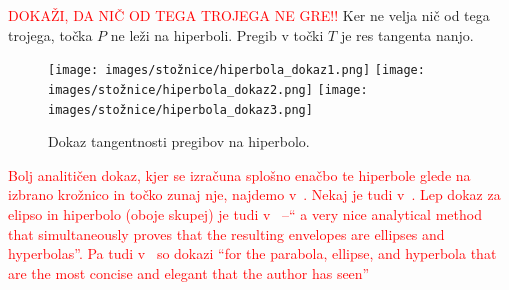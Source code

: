 \begin{dokaz}
    \textcolor{red}{DOKAŽI, DA NIČ OD TEGA TROJEGA NE GRE!!}
    Ker ne velja nič od tega trojega, točka $P$ ne leži na hiperboli. Pregib v točki $T$ je res tangenta nanjo.

    \begin{figure}[h]
        \centering
        \texttt{[image: images/stožnice/hiperbola\_dokaz1.png]}
        \texttt{[image: images/stožnice/hiperbola\_dokaz2.png]}
        \texttt{[image: images/stožnice/hiperbola\_dokaz3.png]}
        \caption[Tangentnost na hiperbolo]{Dokaz tangentnosti pregibov na hiperbolo.}
        \label{fig:dokaz_hiperbola}
    \end{figure}  
\end{dokaz}

\textcolor{red}{Bolj analitičen dokaz, kjer se izračuna splošno enačbo te hiperbole glede na izbrano krožnico in točko zunaj nje, najdemo v~\cite[str.\ 205--206]{smith2003}. Nekaj je tudi v~\cite[str.\ 34 spodaj]{hull2020}. Lep dokaz za elipso in hiperbolo (oboje skupej) je tudi v~\cite{lotka1907} --`` a very nice analytical method that simultaneously proves that the resulting envelopes are ellipses and hyperbolas''. Pa tudi v~\cite{yates1943} so dokazi ``for the parabola, ellipse, and hyperbola that are the most concise and elegant that the
author has seen''}